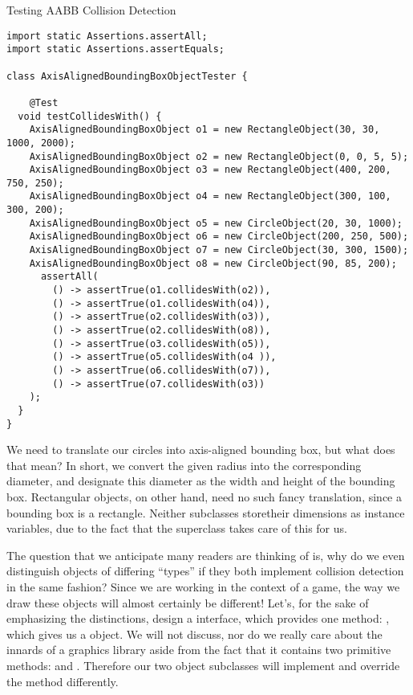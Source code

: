 \begin{cl}{Testing AABB Collision Detection}
\begin{lstlisting}[language=MyJava]
import static Assertions.assertAll;
import static Assertions.assertEquals;

class AxisAlignedBoundingBoxObjectTester {

    @Test
  void testCollidesWith() {
    AxisAlignedBoundingBoxObject o1 = new RectangleObject(30, 30, 1000, 2000);
    AxisAlignedBoundingBoxObject o2 = new RectangleObject(0, 0, 5, 5);
    AxisAlignedBoundingBoxObject o3 = new RectangleObject(400, 200, 750, 250);
    AxisAlignedBoundingBoxObject o4 = new RectangleObject(300, 100, 300, 200);
    AxisAlignedBoundingBoxObject o5 = new CircleObject(20, 30, 1000);
    AxisAlignedBoundingBoxObject o6 = new CircleObject(200, 250, 500);
    AxisAlignedBoundingBoxObject o7 = new CircleObject(30, 300, 1500);
    AxisAlignedBoundingBoxObject o8 = new CircleObject(90, 85, 200);
      assertAll(
        () -> assertTrue(o1.collidesWith(o2)),
        () -> assertTrue(o1.collidesWith(o4)),
        () -> assertTrue(o2.collidesWith(o3)),
        () -> assertTrue(o2.collidesWith(o8)),
        () -> assertTrue(o3.collidesWith(o5)),
        () -> assertTrue(o5.collidesWith(o4 )),
        () -> assertTrue(o6.collidesWith(o7)),
        () -> assertTrue(o7.collidesWith(o3))
    );
  }
}
\end{lstlisting}
\end{cl}

We need to translate our circles into axis-aligned bounding box, but what does that mean? In short, we convert the given radius into the corresponding diameter, and designate this diameter as the width and height of the bounding box. Rectangular objects, on other hand, need no such fancy translation, since a bounding box is a rectangle. Neither subclasses storetheir dimensions as instance variables, due to the fact that the superclass takes care of this for us.

The question that we anticipate many readers are thinking of is, why do we even distinguish objects of differing ``types'' if they both implement collision detection in the same fashion? Since we are working in the context of a game, the way we draw these objects will almost certainly be different! Let's, for the sake of emphasizing the distinctions, design a  interface, which provides one method: , which gives us a  object. We will not discuss, nor do we really care about the innards of a graphics library aside from the fact that it contains two primitive methods:  and . Therefore our two object subclasses will implement  and override the method differently.


